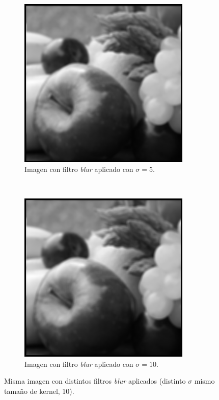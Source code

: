 \documentclass[12pt, letterpaper]{article}
\begin{document}
\begin{figure}[H]
\begin{subfigure}[t]{0.32\textwidth}
      \includegraphics[width = 0.9\textwidth]{frutas_std5.png}
      \caption{Imagen con filtro \textit{blur} aplicado con $\sigma=5$.}
  \end{subfigure}
  ~ 
  \begin{subfigure}[t]{0.32\textwidth}
      \centering
      \includegraphics[width = 0.9\textwidth]{frutas_std10.png}
      \caption{Imagen con filtro \textit{blur} aplicado con $\sigma=10$.}
  \end{subfigure}
  \caption{Misma imagen con distintos filtros \textit{blur} aplicados (distinto $\sigma$ mismo tamaño de kernel, 10). }
  \label{fig:frutas}
\end{figure}
\end{document}
